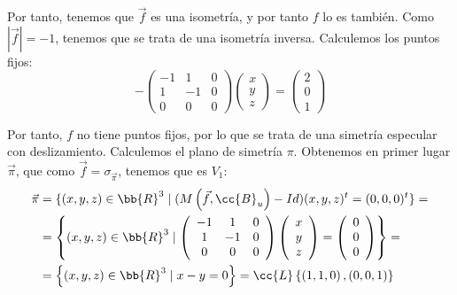 \begin{ejercicio}
\begin{enumerate}
        Por tanto, tenemos que $\vec{f}$ es una isometría, y por tanto $f$ lo es también. Como $\left|\vec{f}\right|=-1$, tenemos que se trata de una isometría inversa. Calculemos los puntos fijos:
        \begin{equation*}
            -\left(
            \begin{array}{ccc}
                -1 & 1 & 0 \\
                1 & -1 & 0 \\
                0 & 0 & 0 
            \end{array}
            \right)
            \left(
            \begin{array}{c}
                x \\ y \\ z
            \end{array}
            \right)
            = \left(
            \begin{array}{c}
                2 \\ 0 \\ 1
            \end{array}
            \right)
        \end{equation*}

        Por tanto, $f$ no tiene puntos fijos, por lo que se trata de una simetría especular con deslizamiento. Calculemos el plano de simetría $\pi$. Obtenemos en primer lugar $\vec{\pi}$, que como $\vec{f}=\sigma_{\vec{\pi}}$, tenemos que es $V_1$:
        \begin{equation*}
            \begin{split}
                \vec{\pi} &= \{ (x,y,z)\in \bb{R}^3 \mid (M\left(\vec{f}, \cc{B}_u\right) - Id) (x,y,z)^t = (0,0, 0)^t \} =\\
                &= \left\{ (x,y,z)\in \bb{R}^3 \mid \left(
                \begin{array}{ccc}
                    -1 & 1 & 0\\
                    1 & -1 & 0\\
                    0 & 0 & 0
                \end{array}
                \right)
                \left(
                \begin{array}{c}
                    x\\y\\z
                \end{array}
                \right)
                = \left(
                \begin{array}{c}
                    0\\0\\0
                \end{array}
                \right)
                \right\} =\\
                &= \left\{ (x,y,z)\in \bb{R}^3 \mid x-y=0
                \right\} = \cc{L}\left\{\left(1,1,0\right), \left(0,0,1\right)\right\}
            \end{split}
        \end{equation*}


\end{enumerate}
\end{ejercicio}
